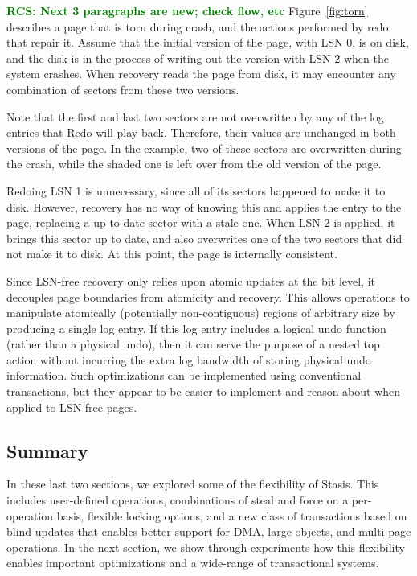 \documentclass[letterpaper,twocolumn,10pt]{article}
\newcommand{\yad}{Stasis\xspace}
\newcommand{\rcs}[1]{\textcolor{green}{\bf RCS: #1}}
\begin{document}
\rcs{Next 3 paragraphs are new; check flow, etc}
Figure~\ref{fig:torn} describes a page that is torn during crash, and the actions performed by redo that repair it.  Assume that the initial version
of the page, with LSN $0$, is on disk, and the disk is in the process
of writing out the version with LSN $2$ when the system crashes.  When
recovery reads the page from disk, it may encounter any combination of
sectors from these two versions.

Note that the first and last two sectors are not overwritten by any of
the log entries that Redo will play back.  Therefore, their values are
unchanged in both versions of the page.  In the example, two of these
sectors are overwritten during the crash, while the shaded one is left
over from the old version of the page. 

Redoing LSN 1 is unnecessary, since all of its sectors happened to
make it to disk.  However, recovery has no way of knowing this and
applies the entry to the page, replacing a up-to-date sector with a
stale one.  When LSN 2 is applied, it brings this sector up to date,
and also overwrites one of the two sectors that did not make it to
disk.  At this point, the page is internally consistent.

Since LSN-free recovery only relies upon atomic updates at the bit
level, it decouples page boundaries from atomicity and recovery.  This
allows operations to manipulate atomically (potentially
non-contiguous) regions of arbitrary size by producing a single log
entry.  If this log entry includes a logical undo function (rather
than a physical undo), then it can serve the purpose of a nested top
action without incurring the extra log bandwidth of storing physical
undo information.  Such optimizations can be implemented using
conventional transactions, but they appear to be easier to implement
and reason about when applied to LSN-free pages.

\subsection{Summary}

In these last two sections, we explored some of the flexibility of \yad. This
includes user-defined operations, combinations of steal and force on
a per-operation basis, flexible locking options, and a new class of
transactions based on blind updates that enables better support for
DMA, large objects, and multi-page operations.  In the next section,
we show through experiments how this flexibility enables important
optimizations and a wide-range of transactional systems.
\end{document}

